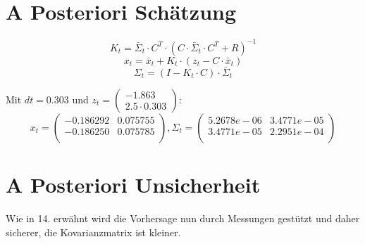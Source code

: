 \documentclass[12pt,a4paper]{article}
\begin{document}
\section{A Posteriori Schätzung}
\[
K_t = \bar{\Sigma}_t \cdot C^T \cdot (C \cdot \bar{\Sigma}_t \cdot C^T + R)^{-1}
\]
\[
x_t = \bar{x}_t + K_t \cdot (z_t - C \cdot \bar{x}_t)
\]
\[
\Sigma_t = (I - K_t \cdot C) \cdot \bar{\Sigma}_t
\]

Mit $dt = 0.303$ und $z_t = \begin{pmatrix}
-1.863 \\
2.5 \cdot 0.303
\end{pmatrix}$:
\[
x_t = \begin{pmatrix}
  -0.186292  & 0.075755\\
  -0.186250  & 0.075785\\
\end{pmatrix}, \Sigma_t = 
\begin{pmatrix}
   5.2678e-06  & 3.4771e-05\\
   3.4771e-05  & 2.2951e-04\\
\end{pmatrix}
\]

\section{A Posteriori Unsicherheit}
Wie in 14. erwähnt wird die Vorhersage nun durch Messungen gestützt und daher sicherer, die Kovarianzmatrix ist kleiner.
\end{document}
